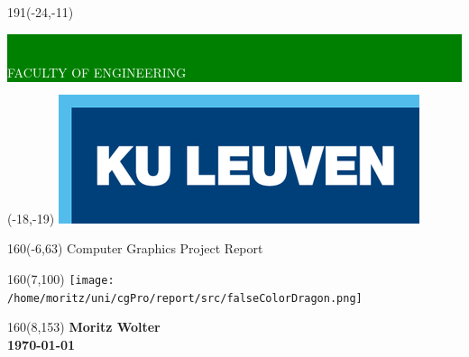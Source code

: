 

\thispagestyle{empty}
\newcommand{\form}[1]{\scalebox{1.087}{\boldmath{#1}}}
\sffamily
%
\begin{textblock}{191}(-24,-11)
\colorbox{green}{\hspace{139mm}\ \parbox[c][18truemm]{60mm}{\textcolor{white}{FACULTY OF ENGINEERING}}}
\end{textblock}
%
\begin{textblock}{70}(-18,-19)
\textblockcolour{}
\includegraphics*[height=19.8truemm]{./src/LogoKULeuven}
\end{textblock}
%
\begin{textblock}{160}(-6,63)
\textblockcolour{}
\vspace{-\parskip}
\flushleft
\fontsize{40}{42}\selectfont \textcolor{bluetitle}{Computer Graphics Project Report }\\[1.5mm]
\end{textblock}
%
\vspace{-\parskip}
\begin{textblock}{160}(7,100)
\texttt{[image: /home/moritz/uni/cgPro/report/src/falseColorDragon.png]}
\end{textblock}
%
\begin{textblock}{160}(8,153)
\textblockcolour{}
\vspace{-\parskip}
\flushright
\fontsize{14}{16}\selectfont \textbf{Moritz Wolter \\ \today}
\flushright
\end{textblock}
